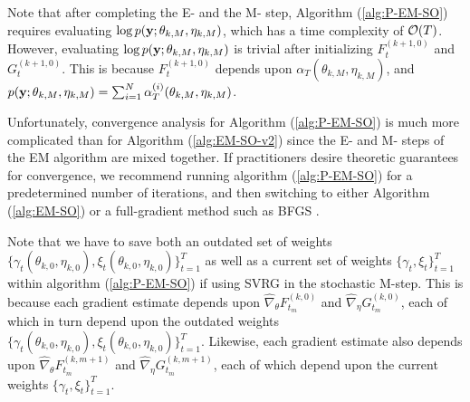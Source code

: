 Note that after completing the E- and the M- step, Algorithm (\ref{alg:P-EM-SO}) requires evaluating $\log p(\mathbf{y};\theta_{k,M},\eta_{k,M})$, which has a time complexity of $\mathcal{O}(T)$. However, evaluating $\log p(\mathbf{y};\theta_{k,M},\eta_{k,M})$ is trivial after initializing $F_t^{(k+1,0)}$ and $G_t^{(k+1,0)}$. This is because $F_t^{(k+1,0)}$ depends upon $\alpha_T(\theta_{k,M},\eta_{k,M})$, and $p(\mathbf{y};\theta_{k,M},\eta_{k,M}) = \sum_{i=1}^N \alpha_T^{(i)}(\theta_{k,M},\eta_{k,M})$.

Unfortunately, convergence analysis for Algorithm (\ref{alg:P-EM-SO}) is much more complicated than for Algorithm (\ref{alg:EM-SO-v2}) since the E- and M- steps of the EM algorithm are mixed together. If practitioners desire theoretic guarantees for convergence, we recommend running algorithm (\ref{alg:P-EM-SO}) for a predetermined number of iterations, and then switching to either Algorithm (\ref{alg:EM-SO}) or a full-gradient method such as BFGS \citep{Fletcher:2000}.




Note that we have to save both an outdated set of weights $\big\{\gamma_t(\theta_{k,0},\eta_{k,0}),\xi_t(\theta_{k,0},\eta_{k,0})\big\}_{t=1}^T$ as well as a current set of weights $\big\{ \gamma_t,\xi_t \big\}_{t=1}^T$ within algorithm (\ref{alg:P-EM-SO}) if using SVRG in the stochastic M-step. This is because each gradient estimate depends upon $\widehat \nabla_\theta F_{t_m}^{(k,0)}$ and $\widehat \nabla_\eta G_{t_m}^{(k,0)}$, each of which in turn depend upon the outdated weights $\{\gamma_t(\theta_{k,0},\eta_{k,0}),\xi_t(\theta_{k,0},\eta_{k,0})\}_{t=1}^T$. Likewise, each gradient estimate also depends upon $\widehat \nabla_\theta F_{t_m}^{(k,m+1)}$ and $\widehat \nabla_\eta G_{t_m}^{(k,m+1)}$, each of which depend upon the current weights $\big\{ \gamma_t,\xi_t \big\}_{t=1}^T$.

